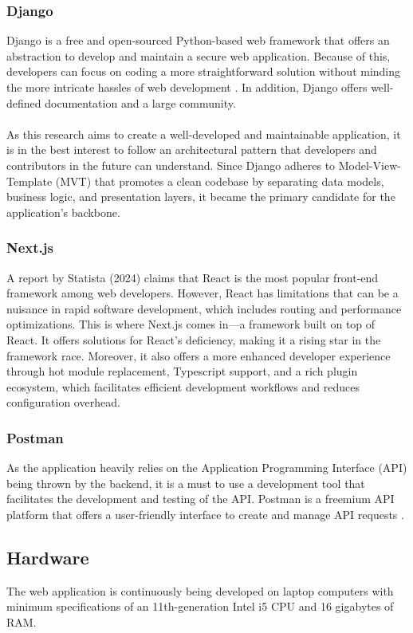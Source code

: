 \subsubsection{Django}
Django is a free and open-sourced Python-based web framework that offers an abstraction to develop and maintain a secure web application. Because of this, developers can focus on coding a more straightforward solution without minding the more intricate hassles of web development \cite{django-no-date}. In addition, Django offers well-defined documentation and a large community. \\\\
As this research aims to create a well-developed and maintainable application, it is in the best interest to follow an architectural pattern that developers and contributors in the future can understand. Since Django adheres to Model-View-Template (MVT) that promotes a clean codebase by separating data models, business logic, and presentation layers, it became the primary candidate for the application's backbone. 


\subsubsection{Next.js}
A report by Statista (2024) claims that React is the most popular front-end framework among web developers. However, React has limitations that can be a nuisance in rapid software development, which includes routing and performance optimizations. This is where Next.js comes in—a framework built on top of React. It offers solutions for React's deficiency, making it a rising star in the framework race. Moreover, it also offers a more enhanced developer experience through hot module replacement, Typescript support, and a rich plugin ecosystem, which facilitates efficient development workflows and reduces configuration overhead.

\subsubsection{Postman}
As the application heavily relies on the Application Programming Interface (API) being thrown by the backend, it is a must to use a development tool that facilitates the development and testing of the API. Postman is a freemium API platform that offers a user-friendly interface to create and manage API requests \cite{postman-no-date}. 

\subsection{Hardware}
The web application is continuously being developed on laptop computers with minimum specifications of an 11th-generation Intel i5 CPU and 16 gigabytes of RAM.

